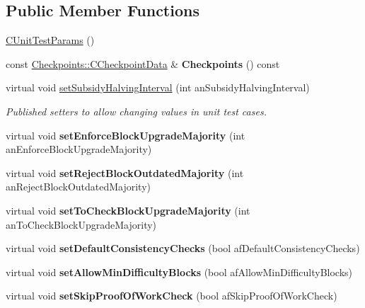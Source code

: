 \subsection*{Public Member Functions}
\begin{DoxyCompactItemize}
\item 
\mbox{\hyperlink{class_c_unit_test_params_a851e71faf703b4e2f611083c79b7eb92}{C\+Unit\+Test\+Params}} ()
\item 
\mbox{\label{class_c_unit_test_params_a2ae5bc37269708082a6c95ad647d13d0}} 
const \mbox{\hyperlink{struct_checkpoints_1_1_c_checkpoint_data}{Checkpoints\+::\+C\+Checkpoint\+Data}} \& {\bfseries Checkpoints} () const
\item 
\mbox{\label{class_c_unit_test_params_ad4462df829bb0f363cd76ee337b9407f}} 
virtual void \mbox{\hyperlink{class_c_unit_test_params_ad4462df829bb0f363cd76ee337b9407f}{set\+Subsidy\+Halving\+Interval}} (int an\+Subsidy\+Halving\+Interval)
\begin{DoxyCompactList}\small\item\em Published setters to allow changing values in unit test cases. \end{DoxyCompactList}\item 
\mbox{\label{class_c_unit_test_params_aaee5cb62f06026178329b47a7b4f16fc}} 
virtual void {\bfseries set\+Enforce\+Block\+Upgrade\+Majority} (int an\+Enforce\+Block\+Upgrade\+Majority)
\item 
\mbox{\label{class_c_unit_test_params_a009dc59b829bd566236b90a543b648d3}} 
virtual void {\bfseries set\+Reject\+Block\+Outdated\+Majority} (int an\+Reject\+Block\+Outdated\+Majority)
\item 
\mbox{\label{class_c_unit_test_params_aca002db510d4642c4cd223aaa3180a61}} 
virtual void {\bfseries set\+To\+Check\+Block\+Upgrade\+Majority} (int an\+To\+Check\+Block\+Upgrade\+Majority)
\item 
\mbox{\label{class_c_unit_test_params_af48708fb6ca2926a9b8af27f54593469}} 
virtual void {\bfseries set\+Default\+Consistency\+Checks} (bool af\+Default\+Consistency\+Checks)
\item 
\mbox{\label{class_c_unit_test_params_a87f2d28879e0b81f9f92356ea5a4da24}} 
virtual void {\bfseries set\+Allow\+Min\+Difficulty\+Blocks} (bool af\+Allow\+Min\+Difficulty\+Blocks)
\item 
\mbox{\label{class_c_unit_test_params_aedc2ff95f1b9d8b5bcbdac33774fe8a0}} 
virtual void {\bfseries set\+Skip\+Proof\+Of\+Work\+Check} (bool af\+Skip\+Proof\+Of\+Work\+Check)
\end{DoxyCompactItemize}

